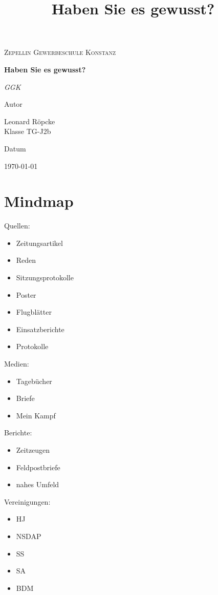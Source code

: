 \documentclass{article}
\title{Haben Sie es gewusst?}
\newcommand{\AuthorName}{Leonard Röpcke\\Klasse TG-J2b}
\newcommand{\Institute}{Zepellin Gewerbeschule Konstanz}
\newcommand{\Subtitle}{GGK}
\newcommand{\MyDate}{\today}
\begin{document}
\begin{titlepage}
  \centering
  {\scshape\LARGE \Institute \par}
  \vspace{2.5cm}
  {\huge\bfseries Haben Sie es gewusst?\par}
  \vspace{0.8cm}
  {\Large\itshape \Subtitle \par}
  \vfill
  {\Large Autor\par}
  {\Large \AuthorName \par}
  \vspace{1cm}
  {\Large Datum\par}
  {\Large \MyDate \par}
  \vfill
  \vspace{1cm}
  {\small }
\end{titlepage}


\section*{Mindmap}
Quellen:
\begin{itemize}
    \item Zeitungsartikel
    \item Reden
    \item Sitzungsprotokolle
    \item Poster
    \item Flugblätter
    \item Einsatzberichte
    \item Protokolle
\end{itemize}
Medien:
\begin{itemize}
    \item Tagebücher
    \item Briefe
    \item Mein Kampf
\end{itemize}
Berichte:
\begin{itemize}
    \item Zeitzeugen
    \item Feldpostbriefe
    \item nahes Umfeld
\end{itemize}
Vereinigungen:
\begin{itemize}
    \item HJ
    \item NSDAP
    \item SS
    \item SA
    \item BDM
\end{itemize}
\end{document}
